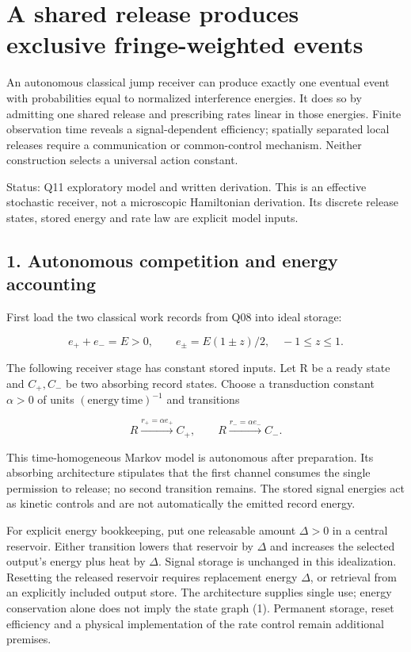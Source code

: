 \documentclass[11pt,a4paper]{article}
\begin{document}
\hypertarget{a-shared-release-produces-exclusive-fringe-weighted-events}{%
\section{A shared release produces exclusive fringe-weighted
events}\label{a-shared-release-produces-exclusive-fringe-weighted-events}}

An autonomous classical jump receiver can produce exactly one eventual
event with probabilities equal to normalized interference energies. It
does so by admitting one shared release and prescribing rates linear in
those energies. Finite observation time reveals a signal-dependent
efficiency; spatially separated local releases require a communication
or common-control mechanism. Neither construction selects a universal
action constant.

Status: Q11 exploratory model and written derivation. This is an
effective stochastic receiver, not a microscopic Hamiltonian derivation.
Its discrete release states, stored energy and rate law are explicit
model inputs.

\hypertarget{autonomous-competition-and-energy-accounting}{%
\subsection{1. Autonomous competition and energy
accounting}\label{autonomous-competition-and-energy-accounting}}

First load the two classical work records from Q08 into ideal storage:

\[e_++e_-=E>0,\qquad e_\pm=E(1\pm z)/2,\quad -1\le z\le1.\]

The following receiver stage has constant stored inputs. Let R be a
ready state and \(C_+,C_-\) be two absorbing record states. Choose a
transduction constant \(\alpha>0\) of units
\((\text{energy}\,\text{time})^{-1}\) and transitions

\[R\xrightarrow{r_+=\alpha e_+}C_+,\qquad
R\xrightarrow{r_-=\alpha e_-}C_-. \tag{1}\]

This time-homogeneous Markov model is autonomous after preparation. Its
absorbing architecture stipulates that the first channel consumes the
single permission to release; no second transition remains. The stored
signal energies act as kinetic controls and are not automatically the
emitted record energy.

For explicit energy bookkeeping, put one releasable amount \(\Delta>0\)
in a central reservoir. Either transition lowers that reservoir by
\(\Delta\) and increases the selected output's energy plus heat by
\(\Delta\). Signal storage is unchanged in this idealization. Resetting
the released reservoir requires replacement energy \(\Delta\), or
retrieval from an explicitly included output store. The architecture
supplies single use; energy conservation alone does not imply the state
graph (1). Permanent storage, reset efficiency and a physical
implementation of the rate control remain additional premises.
\end{document}
